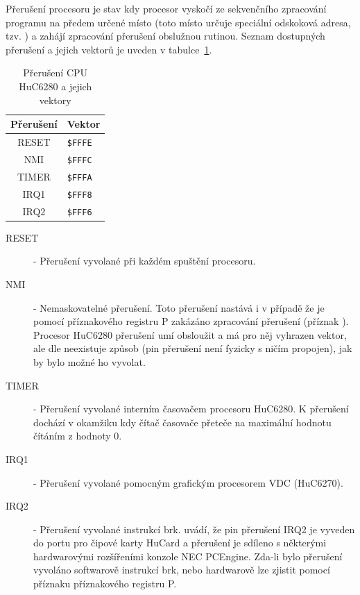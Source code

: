 Přerušení procesoru je stav kdy procesor vyskočí ze sekvenčního zpracování
programu na předem určené místo (toto místo určuje speciální odskoková adresa,
tzv. ) a zahájí zpracování přerušení obslužnou rutinou.
Seznam dostupných přerušení a jejich vektorů je uveden v
tabulce~\ref{tab:cpu_irq}.

\begin{table}[ht]
\begin{center}
\begin{tabular}{|c|l|}
\hline
\textbf{Přerušení} & \textbf{Vektor} \\
\hline
RESET & {\tt \$FFFE}\\
NMI & {\tt \$FFFC}\\
TIMER & {\tt \$FFFA}\\
IRQ1 & {\tt \$FFF8}\\
IRQ2 & {\tt \$FFF6}\\
\hline
\end{tabular}
\end{center}
\caption{Přerušení CPU HuC6280 a jejich vektory\label{tab:cpu_irq}}
\end{table}

\begin{description}
\item[RESET] - Přerušení vyvolané při každém spuštění procesoru.

\item[NMI] - Nemaskovatelné přerušení. Toto přerušení nastává i v případě že je
	pomocí příznakového registru P zakázáno zpracování přerušení (příznak
	). Procesor HuC6280 přerušení umí obsloužit a má pro něj vyhrazen
	vektor, ale dle \cite{MacDonald02} neexistuje způsob (pin přerušení není
	fyzicky s ničím propojen), jak by bylo možné ho vyvolat.

\item[TIMER] - Přerušení vyvolané interním časovačem procesoru HuC6280. K
	přerušení dochází v okamžiku kdy čítač časovače přeteče na maximální
	hodnotu čítáním z hodnoty 0.

\item[IRQ1] - Přerušení vyvolané pomocným grafickým procesorem VDC (HuC6270).

\item[IRQ2] - Přerušení vyvolané instrukcí {\sc brk}. \cite{MacDonald02} uvádí,
	že pin přerušení IRQ2 je vyveden do portu pro čipové karty HuCard a
	přerušení je sdíleno s některými hardwarovými rozšířeními konzole NEC
	PCEngine. Zda-li bylo přerušení vyvoláno softwarově instrukcí {\sc brk},
	nebo hardwarově lze zjistit pomocí příznaku  příznakového registru
	{\sf P}.
\end{description}

